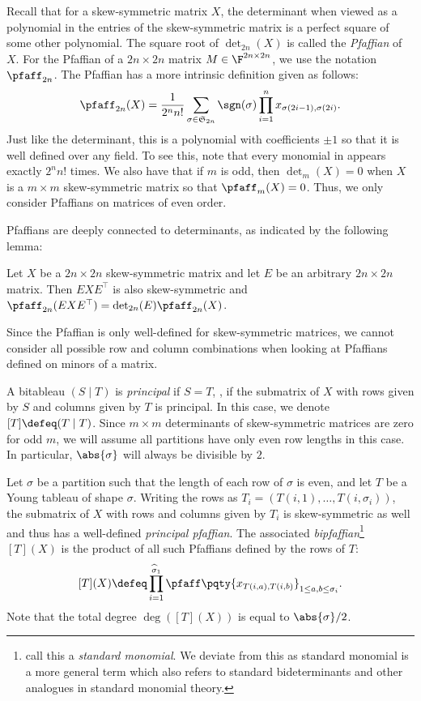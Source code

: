\documentclass[letterpaper, 11pt]{amsart}
\begin{document}
Recall that for a skew-symmetric matrix $X$, the determinant when viewed as a polynomial in the entries of the skew-symmetric matrix is a perfect square of some other polynomial.
The square root of $\det_{2n}(X)$ is called the \emph{Pfaffian} of $X$.
For the Pfaffian of a $2n \times 2n$ matrix $M \in \F^{2n \times 2n}$, we use the notation $\pfaff_{2n}$.
The Pfaffian has a more intrinsic definition given as follows:
\begin{equation}\label{eq:pfaff_defn}
    \pfaff_{2n}(X) = \frac{1}{2^n n!} \sum_{\sigma \in \mathfrak{S}_{2n}} \sgn(\sigma) \prod_{i = 1}^n x_{\sigma(2i - 1), \sigma(2i)}.
\end{equation}
Just like the determinant, this is a polynomial with coefficients $\pm 1$ so that it is well defined over any field.
To see this, note that every monomial in  appears exactly $2^n n!$ times.
We also have that if $m$ is odd, then $\det_m(X) = 0$ when $X$ is a $m \times m$ skew-symmetric matrix so that $\pfaff_m(X) = 0$.
Thus, we only consider Pfaffians on matrices of even order.

Pfaffians are deeply connected to determinants, as indicated by the following lemma:
\begin{lem}[{\cite[Lemma 2.27]{AF21}}]\label{lem:pfaff_conj}
    Let $X$ be a $2n \times 2n$ skew-symmetric matrix and let $E$ be an arbitrary $2n \times 2n$ matrix.
    Then $EXE^\top$ is also skew-symmetric and $\pfaff_{2n}(EXE^\top) = \det_{2n}(E) \pfaff_{2n}(X)$.
\end{lem}

Since the Pfaffian is only well-defined for skew-symmetric matrices, we cannot consider all possible row and column combinations when looking at Pfaffians defined on minors of a matrix.
\begin{defn}\label{defn:principal_bitableau}
    A bitableau $(S \mid T)$ is \emph{principal} if $S = T$, \ie, if the submatrix of $X$ with rows given by $S$ and columns given by $T$ is principal.
    In this case, we denote $[T] \defeq (T \mid T)$.
    Since $m \times m$ determinants of skew-symmetric matrices are zero for odd $m$, we will assume all partitions have only even row lengths in this case.
    In particular, $\abs{\sigma}$ will always be divisible by $2$.
    
    Let $\sigma$ be a partition such that the length of each row of $\sigma$ is even, and let $T$ be a Young tableau of shape $\sigma$.
    Writing the rows as $T_i = (T(i, 1), \ldots, T(i, \sigma_i))$, the submatrix of $X$ with rows and columns given by $T_i$ is skew-symmetric as well and thus has a well-defined \emph{principal pfaffian}.
    The associated \emph{bipfaffian}\footnote{\cite{AF21} call this a \emph{standard monomial}.
    We deviate from this as standard monomial is a more general term which also refers to standard bideterminants and other analogues in standard monomial theory.} $[T](X)$ is the product of all such Pfaffians defined by the rows of $T$: 
    \[
        [T](X) \defeq \prod_{i = 1}^{\widehat{\sigma}_1} \pfaff\pqty{x_{T(i, a), T(i, b)}}_{1 \leq a, b \leq \sigma_i}.
    \]
    Note that the total degree $\deg([T](X))$ is equal to $\abs{\sigma} / 2$.
\end{defn}
\end{document}

